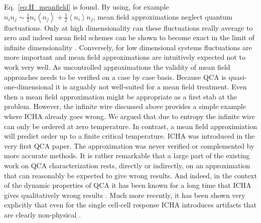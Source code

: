 Eq.~\eqref{eq:H_meanfield} is found. By using, for example $n_i n_j \sim
\frac{1}{2} n_i \left< n_j \right> + \frac{1}{2} \left< n_i \right> n_j$, mean
field approximations neglect quantum fluctuations. Only at high dimensionality
can these fluctuations really average to zero and indeed mean field schemes can
be shown to become exact in the limit of infinite dimensionality \cite{Fehske}.
Conversely, for low dimensional systems fluctuations are more important and mean
field approximations are intuitively expected not to work very well. As
uncontrolled approximations the validity of mean field approaches needs to be
verified on a case by case basis. Because QCA is quasi-one-dimensional it is
arguably not well-suited for a mean field treatment. Even then a mean field
approximation might be appropriate as a first stab at the problem. However, the
infinite wire discussed above provides a simple example where ICHA already goes
wrong. We argued that due to entropy the infinite wire can only be ordered at
zero temperature. In contrast, a mean field approximiation will predict order up
to a finite critical temperature. ICHA was introduced in the very first QCA
paper. The approximation was never verified or complemented by more accurate
methods. It is rather remarkable that a large part of the existing work on QCA
characterization rests, directly or indirectly, on an approximation that can
reasonably be expected to give wrong results. And indeed, in the context of the
dynamic properties of QCA it has been known for a long time that ICHA gives
qualitatively wrong results \cite{toth2001role}. Much more recently, it has been
shown very explicitly that even for the single cell-cell response ICHA
introduces artifacts that are clearly non-physical
\cite{taucer2012consequences}.

